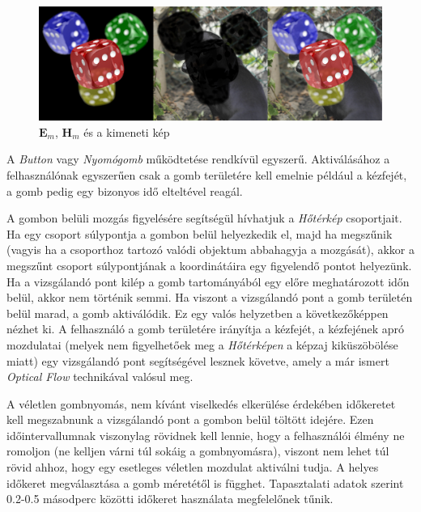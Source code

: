 \begin{figure}[h]
	\centering
	\includegraphics[width=10.24truecm, height=3.41truecm]{images/blending_03.png}
	\caption{$\boldsymbol E_m$, $\boldsymbol H_m$ és a kimeneti kép}
	\label{fig:blend03}
\end{figure}	
		



A \textit{Button} vagy \textit{Nyomógomb} működtetése rendkívül egyszerű. Aktiválásához a felhasználónak egyszerűen csak a gomb területére kell emelnie például a kézfejét, a gomb pedig egy bizonyos idő elteltével reagál.

A gombon belüli mozgás figyelésére segítségül hívhatjuk a \textit{Hőtérkép} csoportjait. Ha egy csoport súlypontja a gombon belül helyezkedik el, majd ha megszűnik (vagyis ha a csoporthoz tartozó valódi objektum abbahagyja a mozgását), akkor a megszűnt csoport súlypontjának a koordinátáira egy figyelendő pontot helyezünk. Ha a vizsgálandó pont kilép a gomb tartományából egy előre meghatározott időn belül, akkor nem történik semmi. Ha viszont a vizsgálandó pont a gomb területén belül marad, a gomb aktiválódik. 
Ez egy valós helyzetben a következőképpen nézhet ki. A felhasználó a gomb területére irányítja a kézfejét, a kézfejének apró mozdulatai (melyek nem figyelhetőek meg a \textit{Hőtérképen} a képzaj kiküszöbölése miatt) egy vizsgálandó pont segítségével lesznek követve, amely a már ismert \textit{Optical Flow} technikával valósul meg.

A véletlen gombnyomás, nem kívánt viselkedés elkerülése érdekében időkeretet kell megszabnunk a vizsgálandó pont a gombon belül töltött idejére. Ezen időintervallumnak viszonylag rövidnek kell lennie, hogy a felhasználói élmény ne romoljon (ne kelljen várni túl sokáig a gombnyomásra), viszont nem lehet túl rövid ahhoz, hogy egy esetleges véletlen mozdulat aktiválni tudja. A helyes időkeret megválasztása a gomb méretétől is függhet. Tapasztalati adatok szerint 0.2-0.5 másodperc közötti időkeret használata megfelelőnek tűnik.


